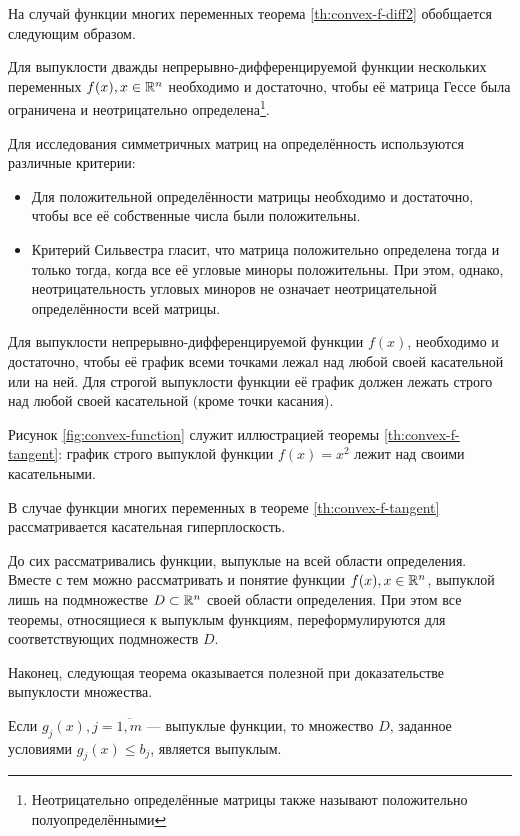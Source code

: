 На случай функции многих переменных теорема \ref{th:convex-f-diff2}
обобщается следующим образом.
\begin{thm}
  \label{th:convex-f-hess}
  Для выпуклости дважды непрерывно-дифференцируемой функции нескольких
  переменных $f(x), x \in \mathbb{R}^n$ необходимо и достаточно, чтобы её
  матрица Гессе была ограничена и неотрицательно
  определена\footnote{Неотрицательно определённые матрицы также
    называют положительно полуопределёнными}.
\end{thm}
Для исследования симметричных матриц на определённость используются
различные критерии:
\begin{itemize}
\item Для положительной определённости матрицы необходимо и
  достаточно, чтобы все её собственные числа были положительны.
\item Критерий Сильвестра гласит, что матрица положительно определена
  тогда и только тогда, когда все её угловые миноры положительны. При
  этом, однако, неотрицательность угловых миноров не означает
  неотрицательной определённости всей матрицы.
\end{itemize}

\begin{thm}
  \label{th:convex-f-tangent}
  Для выпуклости непрерывно-дифференцируемой функции $f(x)$,
  необходимо и достаточно, чтобы её график всеми точками лежал над
  любой своей касательной или на ней. Для строгой выпуклости функции
  её график должен лежать строго над любой своей касательной (кроме
  точки касания).
\end{thm}
Рисунок \ref{fig:convex-function} служит иллюстрацией теоремы
\ref{th:convex-f-tangent}: график строго выпуклой функции $f(x) = x^2$
лежит над своими касательными.

В случае функции многих переменных в теореме \ref{th:convex-f-tangent}
рассматривается касательная гиперплоскость.

\begin{rem}
  До сих рассматривались функции, выпуклые на всей области
  определения. Вместе с тем можно рассматривать и понятие функции
  $f(x), x \in \mathbb{R}^n$, выпуклой лишь на подмножестве $D \subset
  \mathbb{R}^n$ своей области определения. При этом все теоремы,
  относящиеся к выпуклым функциям, переформулируются для
  соответствующих подмножеств $D$.
\end{rem}

Наконец, следующая теорема оказывается полезной при доказательстве
выпуклости множества.
\begin{thm}
  \label{th:convex-set}
  Если $g_j(x), j=\overline{1,m}$ — выпуклые функции, то множество
  $D$, заданное условиями $g_j(x) \leq b_j$, является выпуклым.
\end{thm}
